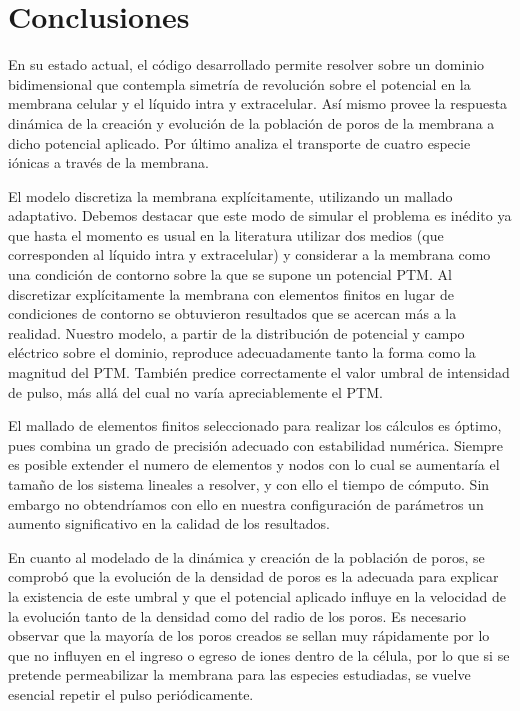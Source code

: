 \chapter{Conclusiones}

En su estado actual, el código desarrollado permite resolver sobre un dominio bidimensional que contempla simetría de revolución sobre el potencial en la membrana celular y el líquido intra y extracelular. Así mismo provee la respuesta dinámica de la creación y evolución de la población de poros de la membrana a dicho potencial aplicado. Por último analiza el transporte de cuatro especie iónicas a través de la membrana.

El modelo discretiza la membrana explícitamente, utilizando un mallado adaptativo. Debemos destacar que este modo de simular el problema es inédito ya que hasta el momento es usual en la literatura utilizar dos medios (que corresponden al líquido intra y extracelular) y considerar a la membrana como una condición de contorno sobre la que se supone un potencial PTM. Al discretizar explícitamente la membrana con elementos finitos en lugar de condiciones de contorno se obtuvieron resultados que se acercan más a la realidad. Nuestro modelo, a partir de la distribución de potencial y campo eléctrico sobre el dominio, reproduce adecuadamente tanto la forma como la magnitud del PTM. También predice correctamente el valor umbral de intensidad de pulso, más allá del cual no varía apreciablemente el PTM.

El mallado de elementos finitos seleccionado para realizar los cálculos es óptimo, pues combina un grado de precisión adecuado con estabilidad numérica. Siempre es posible extender el numero de elementos y nodos con lo cual se aumentaría el tamaño de los sistema lineales a resolver, y con ello el tiempo de cómputo. Sin embargo no obtendríamos con ello en nuestra configuración de parámetros un aumento significativo en la calidad de los resultados.

En cuanto al modelado de la dinámica y creación de la población de poros, se comprobó que la evolución de la densidad de poros es la adecuada para explicar la existencia de este umbral y que el potencial aplicado influye en la velocidad de la evolución tanto de la densidad como del radio de los poros. 
Es necesario observar que la mayoría de los poros creados se sellan muy rápidamente por lo que no influyen en el ingreso o egreso de iones dentro de la célula, por lo que si se pretende permeabilizar la membrana para las especies estudiadas, se vuelve esencial repetir el pulso periódicamente. 


